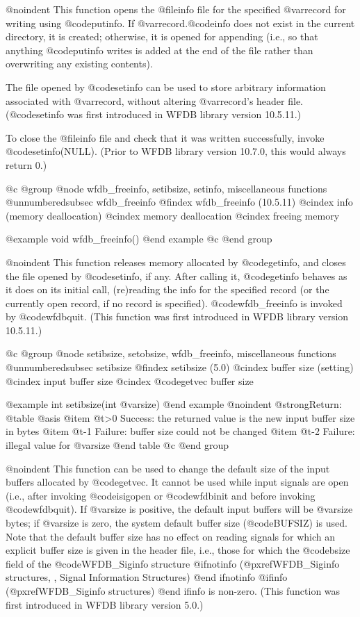 {{{{{{{{{@noindent
This function opens the @file{info} file for the specified @var{record} for
writing using @code{putinfo}.  If @var{record}.@code{info} does not exist in
the current directory, it is created;  otherwise, it is opened for appending
(i.e., so that anything @code{putinfo} writes is added at the end of the
file rather than overwriting any existing contents).

The file opened by @code{setinfo} can be used to store arbitrary information
associated with @var{record}, without altering @var{record}'s header file.
(@code{setinfo} was first introduced in WFDB library version 10.5.11.)

To close the @file{info} file and check that it was written successfully,
invoke @code{setinfo(NULL)}.  (Prior to WFDB library version 10.7.0, this would
always return 0.)

@c @group
@node     wfdb_freeinfo, setibsize, setinfo, miscellaneous functions
@unnumberedsubsec wfdb_freeinfo
@findex wfdb_freeinfo (10.5.11)
@cindex info (memory deallocation)
@cindex memory deallocation
@cindex freeing memory

@example
void wfdb_freeinfo()
@end example
@c @end group

@noindent
This function releases memory allocated by @code{getinfo}, and closes
the file opened by @code{setinfo}, if any.  After calling it, @code{getinfo}
behaves as it does on its initial call, (re)reading the info for the specified
record (or the currently open record, if no record is specified).
@code{wfdb_freeinfo} is invoked by @code{wfdbquit}.
(This function was first introduced in WFDB library version 10.5.11.)

@c @group
@node     setibsize, setobsize, wfdb_freeinfo, miscellaneous functions
@unnumberedsubsec setibsize
@findex setibsize (5.0)
@cindex buffer size (setting)
@cindex input buffer size
@cindex @code{getvec} buffer size

@example
int setibsize(int @var{size})
@end example
@noindent
@strong{Return:}
@table @asis
@item @t{>0}
Success: the returned value is the new input buffer size in bytes
@item @t{-1}
Failure: buffer size could not be changed
@item @t{-2}
Failure: illegal value for @var{size}
@end table
@c @end group

@noindent
This function can be used to change the default size of the input
buffers allocated by @code{getvec}.  It cannot be used while input
signals are open (i.e., after invoking @code{isigopen} or @code{wfdbinit}
and before invoking @code{wfdbquit}).  If @var{size} is positive, the
default input buffers will be @var{size} bytes;  if @var{size} is zero,
the system default buffer size (@code{BUFSIZ}) is used.  Note that
the default buffer size has no effect on reading signals for which
an explicit buffer size is given in the header file, i.e.,
those for which the @code{bsize} field of the @code{WFDB_Siginfo} structure
@ifnotinfo
(@pxref{WFDB_Siginfo structures, , Signal Information Structures})
@end ifnotinfo
@ifinfo
(@pxref{WFDB_Siginfo structures})
@end ifinfo
is non-zero.
(This function was first introduced in WFDB library version 5.0.)

}}}}}}}}}

